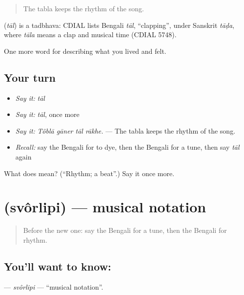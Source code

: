 \begin{quote}
The tabla keeps the rhythm of the song.
\end{quote}

\begin{cousinweb}
\textbf{} (\emph{tāl}) is a tadbhava: CDIAL lists Bengali \emph{tāl}, \textquotedblleft{}clapping\textquotedblright{}, under Sanskrit \emph{tāḍa}, where \emph{tāla} means a clap and musical time (CDIAL 5748).
\end{cousinweb}

\begin{grammarlens}[title={What you've built}]
One more word for describing what you lived and felt.
\end{grammarlens}

\subsection*{Your turn}
\begin{itemize}
\raggedright
  \item \emph{Say it:} \emph{tāl}
  \item \emph{Say it:} \emph{tāl}, once more
  \item \emph{Say it:} \emph{Tôblā gāner tāl rākhe.} — The tabla keeps the rhythm of the song.
  \item \emph{Recall:} say the Bengali for to dye, then the Bengali for a tune, then say \emph{tāl} again
\end{itemize}

\begin{tcolorbox}[breakable,colback=teal!4,colframe=teal!35!black,title={Before you move on}]
What does  mean? (\textquotedblleft{}Rhythm; a beat\textquotedblright{}.) Say it once more.
\end{tcolorbox}
\section[\texorpdfstring{\bn{স্বরলিপি} (svôrlipi)}{স্বরলিপি (svôrlipi)}]{ (svôrlipi) — musical notation}

\label{lesson:BN-C525-svorlipi}



\begin{quote}
Before the new one: say the Bengali for a tune, then the Bengali for rhythm.
\end{quote}

\subsection*{You'll want to know: }
\textbf{} — \emph{svôrlipi} — \textquotedblleft{}musical notation\textquotedblright{}.

